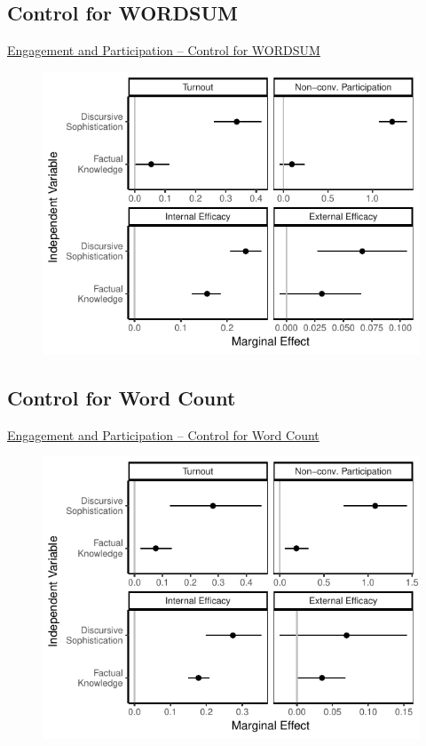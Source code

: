 \subsection{Control for WORDSUM}
\begin{frame}{\hyperlink{engagement}{Engagement and Participation -- Control for WORDSUM}}\label{engagement_wordsum}
  \begin{figure}
  \includegraphics{fig/knoweff_wordsum.pdf}
  \end{figure}
\end{frame}

\subsection{Control for Word Count}
\begin{frame}{\hyperlink{engagement}{Engagement and Participation -- Control for Word Count}}\label{engagement_lwc}
  \begin{figure}
  \includegraphics{fig/knoweff_lwc.pdf}
  \end{figure}
\end{frame}

